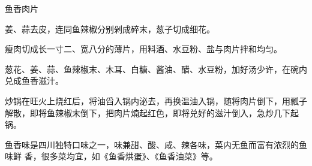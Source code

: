 \begin{recipe}{鱼香肉片}

\ingredients


\cooking

\step 姜、蒜去皮，连同鱼辣椒分别剁成碎末，葱子切成细花。

\step 瘦肉切成长一寸二、宽八分的薄片，用料酒、水豆粉、盐与肉片拌和均匀。

\step 葱花、姜、蒜、鱼辣椒末、木耳、白糖、酱油、醋、水豆粉，加好汤少许，在碗内
兑成鱼香滋汁。

\step 炒锅在旺火上烧红后，将油舀入锅内泌去，再换温油入锅，随将肉片倒下，用瓢子
解散，即将鱼辣椒末倒下，把肉片煵起红色，即将兑好的滋汁倒入，急炒几下起锅。

\notes

鱼香味是四川独特口味之一，味兼甜、酸、咸、辣各味，菜内无鱼而富有浓烈的鱼味鲜
香，很多菜均宜，如《鱼香烘蛋》、《鱼香油菜》等。

\end{recipe}

